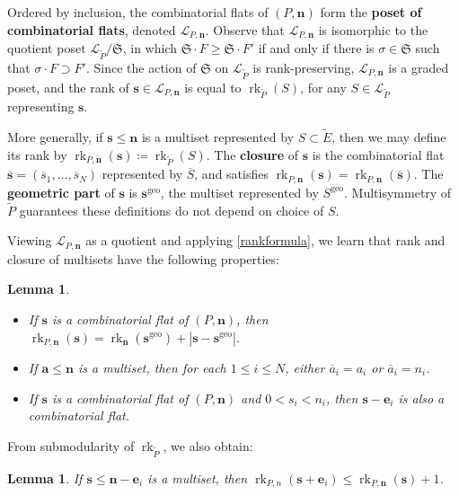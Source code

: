 \documentclass[11pt]{article}
\newtheorem{lemm}[theo]{Lemma}
\theoremstyle{definition}
\numberwithin{equation}{section}
\newcommand{\geo}{\mathrm{geo}}
\DeclareMathOperator{\rk}{rk}
\newcommand{\word}[1]{\textbf{#1}}
\begin{document}
Ordered by inclusion, the combinatorial flats of $(P, \mathbf n)$ form the \word{poset of combinatorial flats}, denoted $\mathcal L_{P, \mathbf n}$.
Observe that $\mathcal L_{P, \mathbf n}$ is isomorphic to the quotient poset $\mathcal L_{\widetilde P} / \mathfrak S$, in which $\mathfrak S \cdot F \geq \mathfrak S \cdot F'$ if and only if there is $\sigma \in \mathfrak S$ such that $\sigma \cdot F \supset F'$.
Since the action of $\mathfrak S$ on $\mathcal L_{\widetilde P}$ is rank-preserving, $\mathcal L_{P, \mathbf n}$ is a graded poset,
and the rank of $\mathbf s \in \mathcal L_{P, \mathbf n}$ is equal to $\rk_{\widetilde P}(S)$, for any $S \in \mathcal L_{\widetilde P}$ representing $\mathbf s$.

More generally, if $\mathbf s \leq \mathbf n$ is a multiset represented by $S \subset \widetilde E$, then we may define its rank by $\rk_{P, \mathbf n}(\mathbf s) \coloneqq \rk_{\widetilde P}(S)$.
The \word{closure} of $\mathbf s$ is the combinatorial flat $\overline{\mathbf s} = (\overline s_1, \ldots, \overline s_N)$ represented by $\overline S$, and satisfies $\rk_{P, \mathbf n}(\mathbf s) = \rk_{P, \mathbf n}(\overline{\mathbf s})$. The \word{geometric part} of $\mathbf s$ is $\mathbf s^\geo$, the multiset represented by $S^\geo$.
Multisymmetry of $\widetilde P$ guarantees these definitions do not depend on choice of $S$.

Viewing $\mathcal L_{P, \mathbf n}$ as a quotient and applying \cref{rankformula}, we learn that rank and closure of multisets have the following properties:
\begin{lemm}\label{combrankformula}\hfill
  \begin{itemize}
  \item If $\mathbf s$ is a combinatorial flat of $(P, \mathbf n)$, then $\rk_{P,\mathbf n}(\mathbf s) = \rk_{\mathbf n}(\mathbf s^\geo) + |\mathbf s -\mathbf s^\geo|$.
  \item If $\mathbf a \leq \mathbf n$ is a multiset, then for each $1 \leq i \leq N$, either $\overline{a}_i = a_i$ or $\overline{a}_i = n_i$.
  \item If $\mathbf s$ is a combinatorial flat of $(P, \mathbf n)$ and $0 < s_i < n_i$, then $\mathbf s - \mathbf e_i$ is also a combinatorial flat.
  \end{itemize}
\end{lemm}
From submodularity of $\rk_{\widetilde P}$, we also obtain:
\begin{lemm}\label{stupidbound}
  If $\mathbf s \leq \mathbf n - \mathbf e_i$ is a multiset, then 
  $\rk_{P, n}(\mathbf s + \mathbf e_i) \leq \rk_{P, \mathbf n}(\mathbf s) + 1$.
\end{lemm}
\end{document}
